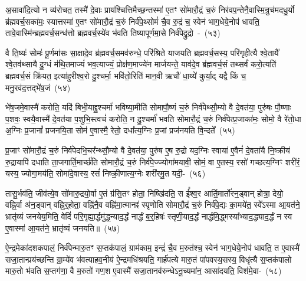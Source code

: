 अ॒सावा॑दि॒त्यो न व्य॑रोचत॒ तस्मै॑ दे॒वाः प्राय॑श्चित्ति\-मैच्छ॒न्तस्मा॑ ए॒तꣳ सो॑मारौ॒द्रं च॒रुं निर॑वप॒न्तेनै॒वास्मि॒न्रुच॑मद\-धु॒र्यो ब्र॑ह्मवर्च॒सका॑मः॒ स्यात्तस्मा॑ ए॒तꣳ सो॑मारौ॒द्रं च॒रुं निर्व॑पे॒थ्सोमं॑ चै॒व रु॒द्रं च॒ स्वेन॑ भाग॒\-धेये॒नोप॑ धावति॒ तावे॒वास्मि॑न्ब्रह्मवर्च॒सन्ध॑त्तो ब्रह्मवर्च॒स्ये॑व भ॑वति तिष्यापूर्णमा॒से निर्व॑पेद्रु॒द्रो~-~(५३)\ip

वै ति॒ष्यः॑ सोमः॑ पू॒र्णमा॑सः सा॒क्षादे॒व ब्र॑ह्मवर्च॒समव॑\-रुन्धे॒ परि॑श्रिते याजयति ब्रह्मवर्च॒सस्य॒ परि॑गृहीत्यै श्वे॒तायै᳚ श्वे॒तव॑थ्सायै दु॒ग्धं म॑थि॒तमाज्यं॑ भव॒त्याज्यं॒ प्रोक्ष॑ण॒माज्ये॑न मार्जयन्ते॒ याव॑दे॒व ब्र॑ह्मवर्च॒सं तथ्सर्वं॑ करो॒त्यति॑ ब्रह्मवर्च॒सं क्रि॑यत॒ इत्या॑हुरीश्व॒रो दु॒श्चर्मा॒ भवि॑तो॒रिति॑ मान॒वी ऋचौ॑ धा॒य्ये॑ कुर्या॒द् यद्वै किं च॒ मनु॒रव॑द॒त्तद्भे॑ष॒जं~(५४)\ip

भे॑ष॒जमे॒वास्मै॑ करोति॒ यदि॑ बिभी॒याद्दु॒श्चर्मा॑ भविष्या॒मीति॑ सोमापौ॒ष्णं च॒रुं निर्व॑पेथ्सौ॒म्यो वै दे॒वत॑या॒ पुरु॑षः पौ॒ष्णाः प॒शवः॒ स्वयै॒वास्मै॑ दे॒वत॑या प॒शुभि॒स्त्वचं॑ करोति॒ न दु॒श्चर्मा॑ भवति सोमारौ॒द्रं च॒रुं निर्व॑पेत्प्र॒जाका॑मः॒ सोमो॒ वै रे॑तो॒धा अ॒ग्निः प्र॒जानां᳚ प्रजनयि॒ता सोम॑ ए॒वास्मै॒ रेतो॒ दधा᳚त्य॒ग्निः प्र॒जां प्रज॑नयति वि॒न्दते᳚~(५५)\ip

प्र॒जाꣳ सो॑मारौ॒द्रं च॒रुं निर्व॑पेदभि॒चर᳚न्थ्सौ॒म्यो वै दे॒वत॑या॒ पुरु॑ष ए॒ष रु॒द्रो यद॒ग्निः स्वाया॑ ए॒वैनं॑ दे॒वता॑यै नि॒ष्क्रीय॑ रु॒द्रायापि॑ दधाति ता॒जगार्ति॒मार्च्छ॑ति सोमारौ॒द्रं च॒रुं निर्व॑पे॒ज्ज्योगा॑मयावी॒ सोमं॒ वा ए॒तस्य॒ रसो॑ गच्छत्य॒ग्निꣳ शरी॑रं॒ यस्य॒ ज्योगा॒मय॑ति॒ सोमा॑दे॒वास्य॒ रसं॑ निष्क्री॒णात्य॒ग्नेः शरी॑रमु॒त यदी॒-~(५६)\ip

तासु॒र्भव॑ति॒ जीव॑त्ये॒व सो॑मारु॒द्रयो॒र्वा ए॒तं ग्र॑सि॒तꣳ होता॒ निष्खि॑दति॒ स ई᳚श्व॒र आर्ति॒मार्तो॑रन॒ड्वान् होत्रा॒ देयो॒ वह्नि॒र्वा अ॑न॒ड्वान् वह्नि॒र्॒\mbox{}होता॒ वह्नि॑नै॒व वह्नि॑मा॒त्मानꣴ॑ स्पृणोति सोमारौ॒द्रं च॒रुं निर्व॑पे॒द्यः का॒मये॑त॒ स्वे᳚\-ऽस्मा आ॒यत॑ने॒ भ्रातृ॑व्यं जनयेय॒मिति॒ वेदिं॑ परि॒गृह्या॒र्द्धमु॑द्ध॒न्याद॒र्द्धं नार्द्धं ब॒र्॒\mbox{}हिषः॑ स्तृणी॒याद॒र्द्धं नार्द्धमि॒द्ध्मस्या᳚भ्याद॒द्ध्याद॒र्द्धं न स्व ए॒वास्मा॑ आ॒यत॑ने॒ भ्रातृ॑व्यं जनयति॥~(५७)\ip

{\anuvakamend[{रु॒द्रो भे॑ष॒जं वि॒न्दते॒ यदि॑ स्तृणी॒याद॒र्द्धं द्वाद॑श च}]}

ऐ॒न्द्रमेका॑\-दश\-कपालं॒ निर्व॑पेन्मारु॒तꣳ स॒प्तक॑पालं॒ ग्राम॑काम॒ इन्द्रं॑ चै॒व म॒रुत॑श्च॒ स्वेन॑ भाग॒\-धेये॒नोप॑ धावति॒ त ए॒वास्मै॑ सजा॒तान्प्रय॑च्छन्ति ग्रा॒म्ये॑व भ॑वत्याहव॒नीय॑ ऐ॒न्द्रमधि॑श्रयति॒ गार्\mbox{}ह॑पत्ये मारु॒तं पा॑पवस्य॒सस्य॒ विधृ॑त्यै स॒प्तक॑पालो मारु॒तो भ॑वति स॒प्तग॑णा॒ वै म॒रुतो॑ गण॒श ए॒वास्मै॑ सजा॒तानव॑\-रुन्धे\-ऽनू॒च्यमा॑न॒ आसा॑दयति॒ विश॑मे॒वा-~(५८)\ip

